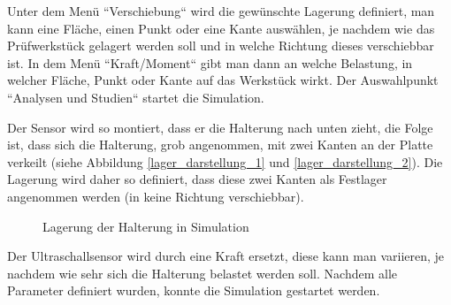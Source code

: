 	Unter dem Menü “Verschiebung“ wird die gewünschte Lagerung definiert, man kann eine Fläche, einen Punkt oder eine Kante auswählen,
	je nachdem wie das Prüfwerkstück gelagert werden soll und in welche Richtung dieses verschiebbar ist.
	In dem Menü “Kraft/Moment“ gibt man dann an welche Belastung, in welcher Fläche, Punkt oder Kante auf das Werkstück wirkt.
	Der Auswahlpunkt “Analysen und Studien“ startet die Simulation.

	Der Sensor wird so montiert, dass er die Halterung nach unten zieht, die Folge ist, dass sich die Halterung, grob angenommen,
	mit zwei Kanten an der Platte verkeilt (siehe Abbildung \ref{lager_darstellung_1} und \ref{lager_darstellung_2}).
	Die Lagerung wird daher so definiert, dass diese zwei Kanten als Festlager angenommen werden (in keine Richtung verschiebbar).

			\begin{figure}[H]
				\begin{centering}
				\par\end{centering}
				\caption{Lagerung der Halterung in Simulation}
				\label{Lagerung_Halterung}
			\end{figure}

	Der Ultraschallsensor wird durch eine Kraft ersetzt, diese kann man variieren, je nachdem wie sehr sich die Halterung belastet werden soll.
	Nachdem alle Parameter definiert wurden, konnte die Simulation gestartet werden.

